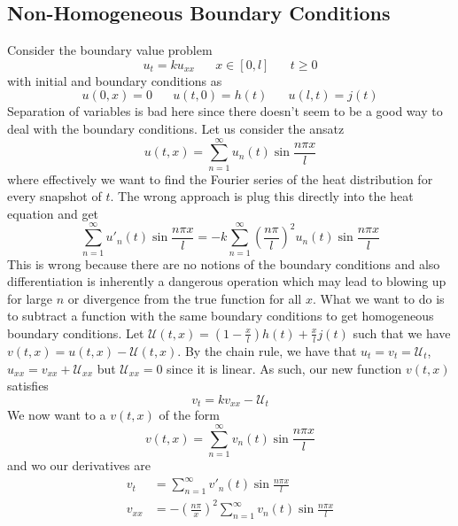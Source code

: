 \documentclass{article}
\newcommand{\twen}{\hspace{20pt}}
\theoremstyle{definition}
\begin{document}
\subsection{Non-Homogeneous Boundary Conditions}
Consider the boundary value problem 
\begin{equation*}
    u_t=ku_{xx} \twen x\in [0,l] \twen t\geq 0
\end{equation*}
with initial and boundary conditions as 
\begin{equation*}
    u(0,x)=0 \twen u(t,0)=h(t) \twen u(l,t)=j(t)
\end{equation*}
Separation of variables is bad here since there doesn't seem to be a good way to deal with the boundary conditions. Let us consider the ansatz 
\begin{equation*}
    u(t,x) = \sum^\infty_{n=1}u_n(t) \sin \frac{n\pi x}{l}
\end{equation*}
where effectively we want to find the Fourier series of the heat distribution for every snapshot of $t$. The wrong approach is plug this directly into the heat equation and get 
\begin{equation*}
    \sum^\infty_{n=1} u'_n(t)\sin \frac{n\pi x}{l} = -k\sum^\infty_{n=1}\left( \frac{n\pi}{l}\right)^2u_n(t)\sin \frac{n\pi x}{l}
\end{equation*}
This is wrong because there are no notions of the boundary conditions and also differentiation is inherently a dangerous operation which may lead to blowing up for large $n$ or divergence from the true function for all $x$. What we want to do is to subtract a function with the same boundary conditions to get homogeneous boundary conditions. Let $\mathcal{U}(t,x) = \left(1-\frac{x}{l}\right) h(t) + \frac{x}{l}j(t)$ such that we have $v(t,x)=u(t,x)-\mathcal{U}(t,x)$. By the chain rule, we have that $u_t = v_t =\mathcal{U}_t$, $u_{xx}=v_{xx}+\mathcal{U}_{xx}$ but $\mathcal{U}_{xx} = 0$ since it is linear. As such, our new function $v(t,x)$ satisfies 
\begin{equation*}
    v_t = kv_{xx}-\mathcal{U}_t
\end{equation*}
We now want to a $v(t,x)$ of the form 
\begin{equation*}
    v(t,x)=\sum^\infty_{n=1}v_n(t)\sin\frac{n\pi x}{l}
\end{equation*}
and wo our derivatives are 
\begin{equation*}
    \begin{split}
        v_t &= \sum^\infty_{n=1}v'_n(t)\sin \frac{n\pi x}{l} \\
        v_{xx} &= -\left( \frac{n\pi}{x} \right)^2 \sum^\infty_{n=1}v_n(t)\sin \frac{n\pi x}{l}
    \end{split}
\end{equation*}
\end{document}
